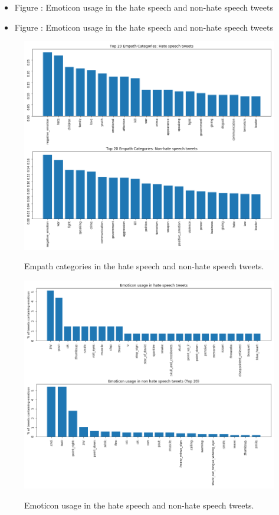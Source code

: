 \documentclass[conference]{IEEEtran}
\begin{document}



\vspace{12pt}

\appendix

\begin{itemize}

    \item Figure : Emoticon usage in the hate speech and non-hate speech tweets 
    \item Figure : Emoticon usage in the hate speech and non-hate speech tweets 
\end{itemize}

\begin{figure}[!t] 
\centering 
\includegraphics[width=5.0in]{liwc_topics} \label{fig:liwc_topics} \hfil 
\caption{Empath categories in the hate speech and non-hate speech tweets.}     
\end{figure} 

\begin{figure}[!t] 
    \centering 
    \includegraphics[width=5.0in]{emoticons} \label{fig:emoticon_usage} \hfil 
    \caption{Emoticon usage in the hate speech and non-hate speech tweets.}     
\end{figure} 
\end{document}
